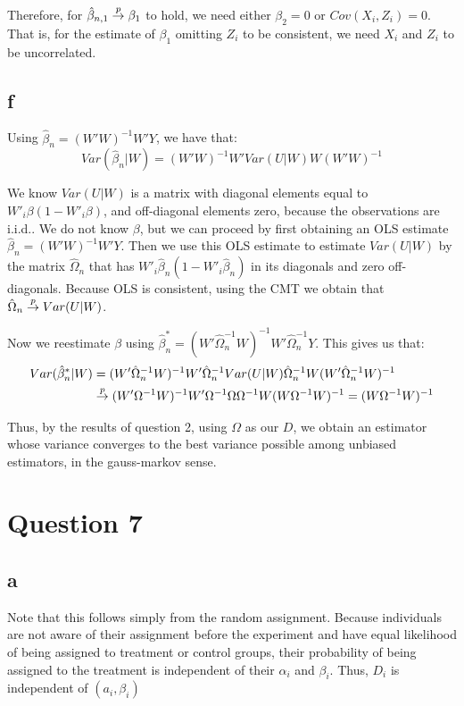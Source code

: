 \documentclass[12pt]{paper}
\begin{document}
Therefore, for $\hat{\beta}_{n,1}\overset{p}{\to}\beta_1$ to hold, we need either $\beta_2=0$ or $Cov(X_i,Z_i)=0$. That is, for the estimate of $\beta_1$ omitting $Z_i$ to be consistent, we need $X_i$ and $Z_i$ to be uncorrelated.

\subsection*{f}

Using $\hat{\beta}_n=(W'W)^{-1}W'Y$, we have that:
\begin{equation}
Var(\hat{\beta}_n|W)=(W'W)^{-1}W'Var(U|W)W(W'W)^{-1}
\end{equation}

We know $Var(U|W)$ is a matrix with diagonal elements equal to $W'_i\beta(1-W'_i\beta)$, and off-diagonal elements zero, because the observations are i.i.d.. We do not know $\beta$, but we can proceed by first obtaining an OLS estimate $\hat{\beta}_n=(W'W)^{-1}W'Y$. Then we use this OLS estimate to estimate $Var(U|W)$ by the matrix $\hat{\Omega}_n$ that has $W'_i\hat{\beta}_n(1-W'_i\hat{\beta}_n)$ in its diagonals and zero off-diagonals. Because OLS is consistent, using the CMT we obtain that $\hat{\Omega}_n\overset{p}{\to} Var(U|W)$.

Now we reestimate $\beta$ using $\hat{\beta}_n^{*}=(W'\hat{\Omega}_n^{-1}W)^{-1}W'\hat{\Omega}_n^{-1}Y$. This gives us that:
\begin{equation}
\begin{split}
Var(\hat{\beta}_n^{*}|W)&=(W'\hat{\Omega}_n^{-1}W)^{-1}W'\hat{\Omega}_n^{-1}Var(U|W)\hat{\Omega}_n^{-1}W(W'\hat{\Omega}_n^{-1}W)^{-1}\\
&\overset{p}{\to} (W'\Omega^{-1}W)^{-1}W'\Omega^{-1}\Omega\Omega^{-1}W(W\Omega^{-1}W)^{-1}=(W\Omega^{-1}W)^{-1}
\end{split}
\end{equation}

Thus, by the results of question 2, using $\Omega$ as our $D$, we obtain an estimator whose variance converges to the best variance possible among unbiased estimators, in the gauss-markov sense.


\section*{Question 7}
\subsection*{a}
Note that this follows simply from the random assignment. Because individuals are not aware of their assignment before the experiment and have equal likelihood of being assigned to treatment or control groups, their probability of being assigned to the treatment is independent of their $\alpha_i$ and $\beta_i$. Thus, $D_i$ is independent of $(a_i,\beta_i)$
\end{document}
